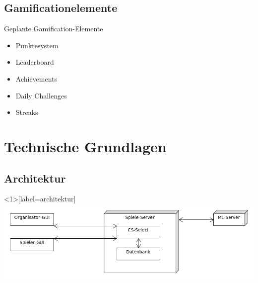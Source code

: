 \documentclass[xcolor=dvipsnames]{beamer}
\begin{document}
\subsection{Gamificationelemente}
\begin{frame}
    \begin{block}{Geplante Gamification-Elemente}
        \begin{itemize}
            \item Punktesystem
            \item Leaderboard
            \item Achievements
            \item Daily Challenges
            \item Streaks
        \end{itemize}
    \end{block}
\end{frame}
\section{Technische Grundlagen}
\subsection{Architektur}
\begin{frame}<1>[label=architektur]
\center
\includegraphics[width=(\textwidth) - 2cm]{../uml/export/Architektur.png}
\end{frame}
\end{document}
